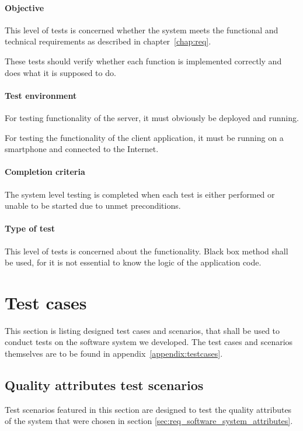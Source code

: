 \documentclass[11pt]{book}
\begin{document}
\paragraph{Objective}
This level of tests is concerned whether the system meets the functional and technical requirements as described in chapter~\ref{chap:req}.

These tests should verify whether each function is implemented correctly and does what it is supposed to do.

\paragraph{Test environment}
For testing functionality of the server, it must obviously be deployed and running.

For testing the functionality of the client application, it must be running on a smartphone and connected to the Internet.

\paragraph{Completion criteria}
The system level testing is completed when each test is either performed or unable to be started due to unmet preconditions.

\paragraph{Type of test}
This level of tests is concerned about the functionality. Black box method shall be used, for it is not essential to know the logic of the application code. 


\section{Test cases} \label{sec:test_cases}

This section is listing designed test cases and scenarios, that shall be used to conduct tests on the software system we developed. The test cases and scenarios themselves are to be found in appendix~\ref{appendix:testcases}.

\subsection{Quality attributes test scenarios}\label{sec:qatestscenarios}
Test scenarios featured in this section are designed to test the quality attributes of the system that were chosen in section \ref{sec:req_software_system_attributes}.
\end{document}
